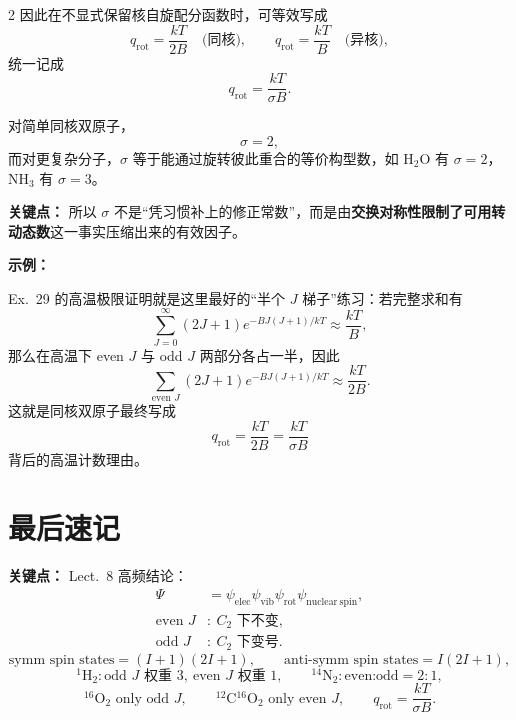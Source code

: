\documentclass[a4paper,9pt]{article}
\newenvironment{keypoint}
{\par\vspace{0.3em}\noindent\begin{tcolorbox}[colback=keybg,colframe=keycolor,boxrule=0.5pt,arc=2pt,left=2pt,right=2pt,top=2pt,bottom=2pt,boxsep=0pt]\noindent\textcolor{keycolor}{\textbf{关键点：}}}
{\end{tcolorbox}\par\vspace{0.3em}}
\newenvironment{examplebox}
{\par\vspace{0.3em}\noindent\begin{tcolorbox}[colback=boxbg,colframe=derivcolor,boxrule=0.5pt,arc=2pt,left=2pt,right=2pt,top=2pt,bottom=2pt,boxsep=0pt]\scriptsize\noindent\textcolor{derivcolor}{\textbf{示例：}}\par\setlength{\parskip}{0.1ex}\setlength{\itemsep}{0pt}\setlength{\parsep}{0pt}}
{\end{tcolorbox}\par\vspace{0.3em}}
\begin{document}
\begin{multicols}{2}
	因此在不显式保留核自旋配分函数时，可等效写成
	\[
		q_{\mathrm{rot}}=\frac{kT}{2B}
		\quad\text{(同核)},
		\qquad
		q_{\mathrm{rot}}=\frac{kT}{B}
		\quad\text{(异核)},
	\]
	统一记成
	\[
		q_{\mathrm{rot}}=\frac{kT}{\sigma B}.
	\]

	对简单同核双原子，
	\[
		\sigma=2,
	\]
	而对更复杂分子，$\sigma$ 等于能通过旋转彼此重合的等价构型数，如 H$_2$O 有 $\sigma=2$，NH$_3$ 有 $\sigma=3$。

	\begin{keypoint}
		所以 $\sigma$ 不是“凭习惯补上的修正常数”，而是由\textbf{交换对称性限制了可用转动态数}这一事实压缩出来的有效因子。
	\end{keypoint}

	\begin{examplebox}
		Ex.~29 的高温极限证明就是这里最好的“半个 $J$ 梯子”练习：若完整求和有
		\[
			\sum_{J=0}^{\infty}(2J+1)e^{-BJ(J+1)/kT}\approx \frac{kT}{B},
		\]
		那么在高温下 even $J$ 与 odd $J$ 两部分各占一半，因此
		\[
			\sum_{\text{even }J}(2J+1)e^{-BJ(J+1)/kT}\approx \frac{kT}{2B}.
		\]
		这就是同核双原子最终写成
		\[
			q_{\mathrm{rot}}=\frac{kT}{2B}=\frac{kT}{\sigma B}
		\]
		背后的高温计数理由。
	\end{examplebox}

	\section{最后速记}
	\begin{keypoint}
		Lect.~8 高频结论：
		\[
			\begin{aligned}
				\Psi          & =\psi_{\mathrm{elec}}\psi_{\mathrm{vib}}\psi_{\mathrm{rot}}\psi_{\mathrm{nuclear\ spin}}, \\
				\text{even }J & :\ C_2\text{ 下不变},                                                                        \\
				\text{odd }J  & :\ C_2\text{ 下变号}.
			\end{aligned}
		\]
		\[
			\text{symm spin states}=(I+1)(2I+1),
			\qquad
			\text{anti-symm spin states}=I(2I+1),
		\]
		\[
			{}^1\mathrm H_2: \text{odd }J\text{ 权重 }3,\ \text{even }J\text{ 权重 }1,
			\qquad
			{}^{14}\mathrm N_2: \text{even:odd}=2:1,
		\]
		\[
			{}^{16}\mathrm O_2\text{ only odd }J,
			\qquad
			{}^{12}\mathrm C{}^{16}\mathrm O_2\text{ only even }J,
			\qquad
			q_{\mathrm{rot}}=\frac{kT}{\sigma B}.
		\]
	\end{keypoint}

\end{multicols}
\end{document}
